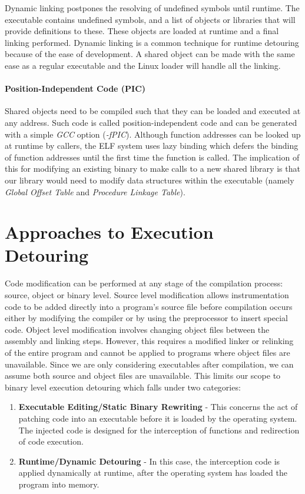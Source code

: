 Dynamic linking postpones the resolving of undefined symbols until runtime. The executable contains undefined symbols, and a list of objects or libraries that will provide definitions to these. These objects are loaded at runtime and a final linking performed. Dynamic linking is a common technique for runtime detouring because of the ease of development. A shared object can be made with the same ease as a regular executable and the Linux loader will handle all the linking.

\paragraph{Position-Independent Code (PIC)}
\label{par:PIC}

Shared objects need to be compiled such that they can be loaded and executed at any address. Such code is called position-independent code and can be generated with a simple \emph{GCC} option (\emph{-fPIC}). Although function addresses can be looked up at runtime by callers, the ELF system uses lazy binding which defers the binding of function addresses until the first time the function is called. The implication of this for modifying an existing binary to make calls to a new shared library is that our library would need to modify data structures within the executable (namely \emph{Global Offset Table} and \emph{Procedure Linkage Table}).

\section{Approaches to Execution Detouring}

Code modification can be performed at any stage of the compilation process: source, object or binary level. Source level modification allows instrumentation code to be added directly into a program's source file before compilation occurs either by modifying the compiler or by using the preprocessor to insert special code\cite{profiling_unix}. Object level modification involves changing object files between the assembly and linking steps\cite{purify_fast_detection}. However, this requires a modified linker or relinking of the entire program and cannot be applied to programs where object files are unavailable. Since we are only considering executables after compilation, we can assume both source and object files are unavailable. This limits our scope to binary level execution detouring which falls under two categories:

\begin{enumerate}
 \item \textbf{Executable Editing/Static Binary Rewriting} - This concerns the act of patching code into an executable before it is loaded by the operating system. The injected code is designed for the interception of functions and redirection of code execution.
 \item \textbf{Runtime/Dynamic Detouring} - In this case, the interception code is applied dynamically at runtime, after the operating system has loaded the program into memory.
\end{enumerate}


